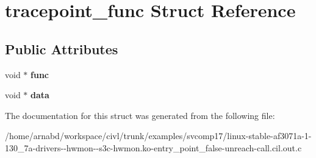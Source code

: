 \hypertarget{structtracepoint__func}{}\section{tracepoint\+\_\+func Struct Reference}
\label{structtracepoint__func}
\subsection*{Public Attributes}
\begin{DoxyCompactItemize}
\item 
\hypertarget{structtracepoint__func_a1d8c0718476f34771d26183b5099bed3}{}void $\ast$ {\bfseries func}\label{structtracepoint__func_a1d8c0718476f34771d26183b5099bed3}

\item 
\hypertarget{structtracepoint__func_ac102c212ba398f2b20823e5d09590107}{}void $\ast$ {\bfseries data}\label{structtracepoint__func_ac102c212ba398f2b20823e5d09590107}

\end{DoxyCompactItemize}


The documentation for this struct was generated from the following file\+:\begin{DoxyCompactItemize}
\item 
/home/arnabd/workspace/civl/trunk/examples/svcomp17/linux-\/stable-\/af3071a-\/1-\/130\+\_\+7a-\/drivers-\/-\/hwmon-\/-\/s3c-\/hwmon.\+ko-\/entry\+\_\+point\+\_\+false-\/unreach-\/call.\+cil.\+out.\+c\end{DoxyCompactItemize}
